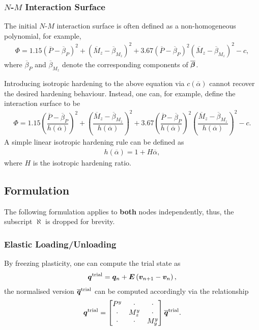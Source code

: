 \subsubsection{$N$-$M$ Interaction Surface}
The initial $N$-$M$ interaction surface is often defined as a non-homogeneous polynomial, for example,
\begin{gather*}
\Phi=1.15\left(\overline{P}-\overline{\beta}_P\right)^2+\left(\overline{M}_z-\overline{\beta}_{M_z}\right)^2+3.67\left(\overline{P}-\overline{\beta}_P\right)^2\left(\overline{M}_z-\overline{\beta}_{M_z}\right)^2-c,
\end{gather*}
where $\overline{\beta}_P$ and $\overline{\beta}_{M_z}$ denote the corresponding components of $\overline{\bm{\beta}}$.

Introducing isotropic hardening to the above equation via $c\left(\overline{\alpha}\right)$ cannot recover the desired hardening behaviour. Instead, one can, for example, define the interaction surface to be
\begin{gather}
\Phi=
1.15\left(\dfrac{\overline{P}-\overline{\beta}_P}{h\left(\overline{\alpha}\right)}\right)^2+
\left(\dfrac{\overline{M}_z-\overline{\beta}_{M_z}}{h\left(\overline{\alpha}\right)}\right)^2+
3.67\left(\dfrac{\overline{P}-\overline{\beta}_P}{h\left(\overline{\alpha}\right)}\right)^2\left(\dfrac{\overline{M}_z-\overline{\beta}_{M_z}}{h\left(\overline{\alpha}\right)}\right)^2-c.
\end{gather}
A simple linear isotropic hardening rule can be defined as
\begin{gather}
h\left(\overline{\alpha}\right)=1+H\overline{\alpha},
\end{gather}
where $H$ is the isotropic hardening ratio.
\subsection{Formulation}
The following formulation applies to \textbf{both} nodes independently, thus, the subscript $\aleph$ is dropped for brevity.
\subsubsection{Elastic Loading/Unloading}
By freezing plasticity, one can compute the trial state as
\begin{gather}\label{eq:nm_qa}
\bm{q}^\text{trial}=\bm{q}_n+\bm{E}\left(\bm{v}_{n+1}-\bm{v}_n\right),
\end{gather}
the normalised version $\bm{\overline{q}}^\text{trial}$ can be computed accordingly via the relationship
\begin{gather}\label{eq:nm_qb}
\bm{q}^\text{trial}=\begin{bmatrix}
P^y&\cdot&\cdot\\\cdot&M_z^y&\cdot\\\cdot&\cdot&M_y^y
\end{bmatrix}\bm{\overline{q}}^\text{trial}.
\end{gather}

